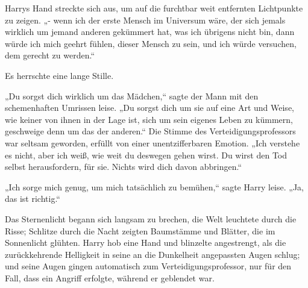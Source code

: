 Harrys Hand streckte sich aus, um auf die furchtbar weit entfernten Lichtpunkte zu zeigen. „- wenn ich der erste Mensch im Universum wäre, der sich jemals wirklich um jemand anderen gekümmert hat, was ich übrigens nicht bin, dann würde ich mich geehrt fühlen, dieser Mensch zu sein, und ich würde versuchen, dem gerecht zu werden.“

Es herrschte eine lange Stille.

„Du sorgst dich wirklich um das Mädchen,“ sagte der Mann mit den schemenhaften Umrissen leise. „Du sorgst dich um sie auf eine Art und Weise, wie keiner von ihnen in der Lage ist, sich um sein eigenes Leben zu kümmern, geschweige denn um das der anderen.“ Die Stimme des Verteidigungsprofessors war seltsam geworden, erfüllt von einer unentzifferbaren Emotion. „Ich verstehe es nicht, aber ich weiß, wie weit du deswegen gehen wirst. Du wirst den Tod selbst herausfordern, für sie. Nichts wird dich davon abbringen.“

„Ich sorge mich genug, um mich tatsächlich zu bemühen,“ sagte Harry leise. „Ja, das ist richtig.“

Das Sternenlicht begann sich langsam zu brechen, die Welt leuchtete durch die Risse; Schlitze durch die Nacht zeigten Baumstämme und Blätter, die im Sonnenlicht glühten. Harry hob eine Hand und blinzelte angestrengt, als die zurückkehrende Helligkeit in seine an die Dunkelheit angepassten Augen schlug; und seine Augen gingen automatisch zum Verteidigungsprofessor, nur für den Fall, dass ein Angriff erfolgte, während er geblendet war.

